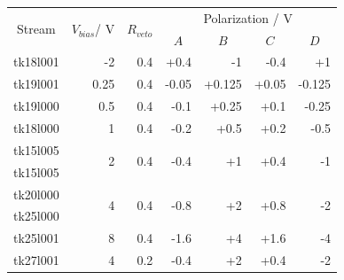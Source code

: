 \begin{table}[]
\centering
\begin{tabular}{c|rrrrrr}
\multicolumn{1}{c|}{\multirow{2}{*}{Stream}} &
  \multicolumn{1}{c|}{\multirow{2}{*}{$V_{bias}$/ V}} &
  \multicolumn{1}{c|}{\multirow{2}{*}{$R_{veto}$}} &
  \multicolumn{4}{c}{Polarization / V} \\ \cline{4-7} 
\multicolumn{1}{c|}{} &
  \multicolumn{1}{c|}{} &
  \multicolumn{1}{c|}{} &
  \multicolumn{1}{c|}{$A$} &
  \multicolumn{1}{c|}{$B$} &
  \multicolumn{1}{c|}{$C$} &
  \multicolumn{1}{c}{$D$} \\ \hline \hline
tk18l001					  & -2                 & 0.4                  & +0.4                  & -1                  & -0.4                  & +1                  \\ \hline
tk19l001                      & 0.25               & 0.4                  & -0.05                 & +0.125              & +0.05                 & -0.125              \\ \hline
tk19l000                      & 0.5                & 0.4                  & -0.1                  & +0.25               & +0.1                  & -0.25               \\ \hline
tk18l000                      & 1                  & 0.4                  & -0.2                  & +0.5                & +0.2                  & -0.5                \\ \hline
tk15l005                      & \multirow{2}{*}{2} & \multirow{2}{*}{0.4} & \multirow{2}{*}{-0.4} & \multirow{2}{*}{+1} & \multirow{2}{*}{+0.4} & \multirow{2}{*}{-1} \\
tk15l005                      &                    &                      &                       &                     &                       &                     \\ \hline
tk20l000                      & \multirow{2}{*}{4} & \multirow{2}{*}{0.4} & \multirow{2}{*}{-0.8} & \multirow{2}{*}{+2} & \multirow{2}{*}{+0.8} & \multirow{2}{*}{-2} \\
tk25l000                      &                    &                      &                       &                     &                       &                     \\ \hline
tk25l001  & 8                  & 0.4                  & -1.6                  & +4                  & +1.6                  & -4                  \\ \hline \hline
tk27l001                      & 4                  & 0.2                  & -0.4                  & +2                  & +0.4                  & -2                  \\ \hline

\end{tabular}
\end{table}
